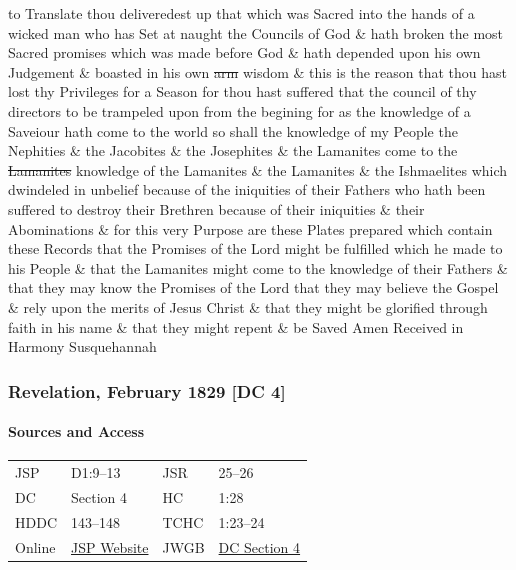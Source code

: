 				to Translate thou deliveredest up that which was Sacred into the hands of a wicked man who has Set at naught the Councils of God \& hath broken the most Sacred promises which was made before God \& hath depended upon his own Judgement \& boasted in his own \sout{arm} wisdom \& this is the reason that thou hast lost thy Privileges for a Season for thou hast suffered that the council of thy directors to be trampeled upon from the begining for as the knowledge of a Saveiour hath come to the world so shall the knowledge of my People the Nephities \& the Jacobites \& the Josephites \& the Lamanites come to the \sout{Lamanites} knowledge of the Lamanites \& the Lamanites \& the Ishmaelites which dwindeled in unbelief because of the iniquities of their Fathers who hath been suffered to destroy their Brethren because of their iniquities \& their Abominations \& for this very Purpose are these Plates prepared which contain these Records that the Promises of the Lord might be fulfilled which he made to his People \& that the Lamanites might come to the knowledge of their Fathers \& that they may know the Promises of the Lord that they may believe the Gospel \& rely upon the merits of Jesus Christ \& that they might be glorified through faith in his name \& that they might repent \& be Saved Amen Received in Harmony Susquehannah
			
		\subsubsection{Revelation, February 1829 [DC 4]}
			\label{EMS-1828-1829-JS-FEB-1829}
			
			\paragraph{Sources and Access}

				\begin{tabular}{p{1in}p{1.5in}p{1in}p{1.5in}}
				JSP	 	& D1:9--13 		& JSR 		& 25--26	 \\  
				DC	 	& Section 4 	& HC 		& 1:28		 \\
				HDDC 	& 143--148 		& TCHC 		& 1:23--24	 \\
				Online  & \href{https://www.josephsmithpapers.org/paper-summary/revelation-february-1829-dc-4/1}{JSP Website} & 
				JWGB	& \hyperref[DC4]{DC Section 4} \\
				\end{tabular}
			
